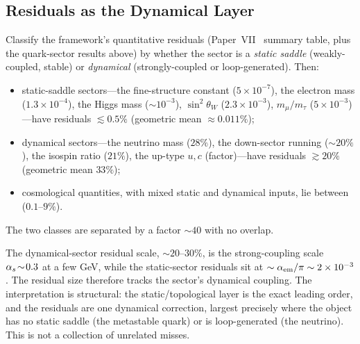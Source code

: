 \subsection*{Residuals as the Dynamical Layer}
\label{P20:sec:residuals}

\begin{proposition}
\label{P20:prop:residual_partition}
Classify the framework's quantitative residuals (Paper~VII~\cite{Paper7}
summary table, plus the quark-sector results above) by whether the
sector is a \emph{static saddle} (weakly-coupled, stable) or
\emph{dynamical} (strongly-coupled or loop-generated). Then:
\begin{itemize}[leftmargin=1.4em]
\item static-saddle sectors---the fine-structure constant
($5\times10^{-7}$), the electron mass ($1.3\times10^{-4}$), the Higgs
mass ($\sim10^{-3}$), $\sin^2\theta_W$ ($2.3\times10^{-3}$),
$m_\mu/m_\tau$ ($5\times10^{-3}$)---have residuals $\lesssim0.5\%$
(geometric mean $\approx0.011\%$);
\item dynamical sectors---the neutrino mass ($28\%$), the down-sector
running ($\sim20\%$), the isospin ratio ($21\%$), the up-type $u,c$
(factor)---have residuals $\gtrsim20\%$ (geometric mean $33\%$);
\item cosmological quantities, with mixed static and dynamical inputs,
lie between ($0.1$--$9\%$).
\end{itemize}
The two classes are separated by a factor $\sim40$ with no overlap.
\end{proposition}

\begin{remark}
\label{P20:rem:coupling_scale}
The dynamical-sector residual scale, $\sim20$--$30\%$, is the
strong-coupling scale $\alpha_s\!\sim\!0.3$ at a few GeV, while the
static-sector residuals sit at $\sim\alpha_{\mathrm{em}}/\pi\sim2\times10^{-3}$.
The residual size therefore tracks the sector's dynamical coupling. The
interpretation is structural: the static/topological layer is the exact
leading order, and the residuals are one dynamical correction, largest
precisely where the object has no static saddle (the metastable quark)
or is loop-generated (the neutrino). This is not a collection of
unrelated misses.
\end{remark}

